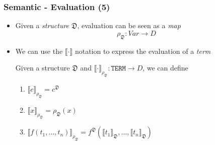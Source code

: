\documentclass{beamer}
\begin{document}
                \begin{frame}
                    \frametitle{Semantic - Evaluation (5)}
                    \begin{itemize}
                        \item Given a \textit{structure} $ \mathfrak{D} $, evaluation can be seen as a \textit{map}
                        \[
                            \rho_\mathfrak{D}: Var \to D
                        \]
                        \item We can use the $ \llbracket \cdot \rrbracket $ notation to express the evaluation of a \textit{term}
                        \begin{definition}
                            Given a structure $ \mathfrak{D} $ and $ \llbracket \cdot \rrbracket_{\rho_\mathfrak{D}}: \texttt{TERM} \to D $, we can define
                            \begin{enumerate}
                                \item $ \llbracket c \rrbracket_{\rho_\mathfrak{D}} = c^\mathfrak{D}$
                                \item $ \llbracket x \rrbracket_{\rho_\mathfrak{D}} = \rho_\mathfrak{D}(x) $
                                \item $ \llbracket f(t_1, \dots, t_n) \rrbracket_{\rho_\mathfrak{D}} = f^\mathfrak{D}(\llbracket t_1 \rrbracket_\mathfrak{D}, \dots, \llbracket t_n \rrbracket_\mathfrak{D}) $
                            \end{enumerate}
                        \end{definition}
                    \end{itemize}
                \end{frame}
\end{document}
